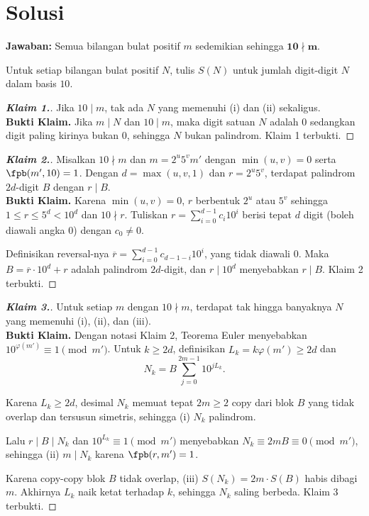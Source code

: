 \newpage
\section{Solusi}
\textbf{Jawaban:} Semua bilangan bulat positif $m$ sedemikian sehingga $\mathbf{10 \nmid m}$.

\medskip
Untuk setiap bilangan bulat positif $N$, tulis $S(N)$ untuk jumlah digit-digit $N$ dalam basis $10$.

\begin{proof}[\textbf{Klaim 1.}] Jika $10 \mid m$, tak ada $N$ yang memenuhi (i) dan (ii) sekaligus.\\
    \textbf{Bukti Klaim.} Jika $m \mid N$ dan $10 \mid m$, maka digit satuan $N$ adalah $0$ sedangkan digit paling kirinya bukan $0$, sehingga $N$ bukan palindrom. Klaim 1 terbukti.
\end{proof}
\hrulefill
\begin{proof}[\textbf{Klaim 2.}] Misalkan $10 \nmid m$ dan $m = 2^u 5^v m'$ dengan $\min(u, v) = 0$ serta $\fpb(m', 10) = 1$. Dengan $d = \max(u, v, 1)$ dan $r = 2^u 5^v$, terdapat palindrom $2d$-digit $B$ dengan $r \mid B$.\\
    \textbf{Bukti Klaim.} Karena $\min(u, v) = 0$, $r$ berbentuk $2^u$ atau $5^v$ sehingga $1 \le r \le 5^d < 10^d$ dan $10 \nmid r$. Tuliskan $r = \sum_{i=0}^{d-1} c_i 10^i$ berisi tepat $d$ digit (boleh diawali angka $0$) dengan $c_0 \ne 0$.

    Definisikan reversal-nya $\overline{r} = \sum_{i=0}^{d-1} c_{d-1-i} 10^i$, yang tidak diawali $0$. Maka $B = \overline{r} \cdot 10^d + r$ adalah palindrom $2d$-digit, dan $r \mid 10^d$ menyebabkan $r \mid B$. Klaim 2 terbukti.
\end{proof}
\hrulefill

\newpage
\begin{proof}[\textbf{Klaim 3.}] Untuk setiap $m$ dengan $10 \nmid m$, terdapat tak hingga banyaknya $N$ yang memenuhi (i), (ii), dan (iii).\\
    \textbf{Bukti Klaim.} Dengan notasi Klaim 2, Teorema Euler menyebabkan $10^{\varphi(m')} \equiv 1 \pmod{m'}$. Untuk $k \ge 2d$, definisikan $L_k = k\varphi(m') \ge 2d$ dan
    \[
        N_k = B \sum_{j=0}^{2m-1} 10^{j L_k}.
    \]

    Karena $L_k \ge 2d$, desimal $N_k$ memuat tepat $2m \ge 2$ copy dari blok $B$ yang tidak overlap dan tersusun simetris, sehingga (i) $N_k$ palindrom.

    Lalu $r \mid B \mid N_k$ dan $10^{L_k} \equiv 1 \pmod{m'}$ menyebabkan $N_k \equiv 2mB \equiv 0 \pmod{m'}$, sehingga (ii) $m \mid N_k$ karena $\fpb(r, m') = 1$.

    Karena copy-copy blok $B$ tidak overlap, (iii) $S(N_k) = 2m \cdot S(B)$ habis dibagi $m$. Akhirnya $L_k$ naik ketat terhadap $k$, sehingga $N_k$ saling berbeda. Klaim 3 terbukti.
\end{proof}
\hrulefill

